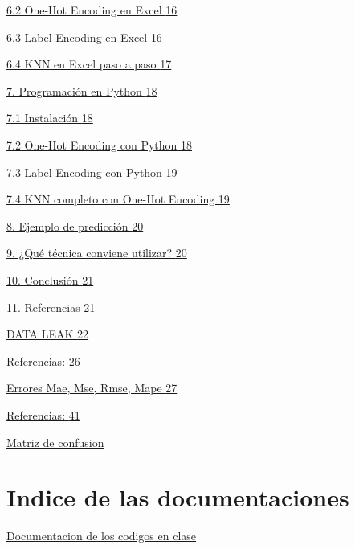 \documentclass[]{article}
\begin{document}
\hyperref[one-hot-encoding-en-excel]{6.2 One-Hot Encoding en Excel
\hyperref[one-hot-encoding-en-excel]{16}}

\hyperref[label-encoding-en-excel]{6.3 Label Encoding en Excel
\hyperref[label-encoding-en-excel]{16}}

\hyperref[knn-en-excel-paso-a-paso]{6.4 KNN en Excel paso a paso
\hyperref[knn-en-excel-paso-a-paso]{17}}

\hyperref[programaciuxf3n-en-python]{7. Programación en Python
\hyperref[programaciuxf3n-en-python]{18}}

\hyperref[instalaciuxf3n]{7.1 Instalación \hyperref[instalaciuxf3n]{18}}

\hyperref[one-hot-encoding-con-python]{7.2 One-Hot Encoding con Python
\hyperref[one-hot-encoding-con-python]{18}}

\hyperref[label-encoding-con-python]{7.3 Label Encoding con Python
\hyperref[label-encoding-con-python]{19}}

\hyperref[knn-completo-con-one-hot-encoding]{7.4 KNN completo con
One-Hot Encoding \hyperref[knn-completo-con-one-hot-encoding]{19}}

\hyperref[ejemplo-de-predicciuxf3n]{8. Ejemplo de predicción
\hyperref[ejemplo-de-predicciuxf3n]{20}}

\hyperref[quuxe9-tuxe9cnica-conviene-utilizar]{9. ¿Qué técnica conviene
utilizar? \hyperref[quuxe9-tuxe9cnica-conviene-utilizar]{20}}

\hyperref[conclusiuxf3n]{10. Conclusión \hyperref[conclusiuxf3n]{21}}

\hyperref[referencias-1]{11. Referencias \hyperref[referencias-1]{21}}

\hyperref[data-leak]{DATA LEAK \hyperref[data-leak]{22}}

\hyperref[referencias-2]{Referencias: \hyperref[referencias-2]{26}}

\hyperref[errores-mae-mse-rmse-mape]{Errores Mae, Mse, Rmse, Mape
\hyperref[errores-mae-mse-rmse-mape]{27}}

\hyperref[referencias-3]{Referencias: \hyperref[referencias-3]{41}}

\hyperref[inv1]{Matriz de confusion}

\section{Indice de las documentaciones}\label{indice-doc}

\hyperref[intrdoc]{Documentacion de los codigos en clase}
\end{document}
